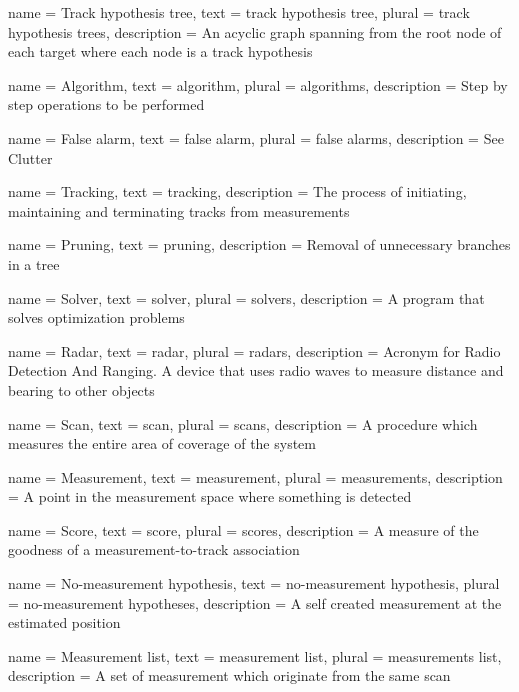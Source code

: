 {
	name 		= {Track hypothesis tree},
	text 		= {track hypothesis tree},
	plural 		= {track hypothesis trees},
	description = {An acyclic graph spanning from the root node of each target where each node is a track hypothesis}
}

{
	name 		= Algorithm,
	text 		= algorithm,
	plural 		= algorithms,
	description = {Step by step operations to be performed}
}

{
	name 		= {False alarm},
	text 		= {false alarm},
	plural 		= {false alarms},
	description = {See Clutter}
}

{
	name 		= Tracking,
	text 		= tracking,
	description = {The process of initiating, maintaining and terminating tracks from measurements}
}

{
	name 		= Pruning,
	text 		= pruning,
	description = {Removal of unnecessary branches in a tree}
}

{
	name 		= Solver,
	text 		= solver,
	plural 		= solvers,
	description = {A program that solves optimization problems}
}

{
	name 		= Radar,
	text 		= radar,
	plural 		= radars,
	description = {Acronym for Radio Detection And Ranging. A device that uses radio waves to measure distance and bearing to other objects}
}

{
	name 		= Scan,
	text		= scan,
	plural 		= scans,
	description = {A procedure which measures the entire area of coverage of the system}
}

{
	name 		= Measurement,
	text 		= measurement,
	plural 		= measurements,
	description = {A point in the measurement space where something is detected}
}

{
	name 		= Score,
	text 		= score,
	plural		= scores,
	description = {A measure of the goodness of a measurement-to-track association}
}

{
	name 		= {No-measurement hypothesis},
	text 		= {no-measurement hypothesis},
	plural		= {no-measurement hypotheses},
	description = {A self created measurement at the estimated position}
}

{
	name 		= {Measurement list},
	text 		= {measurement list},
	plural		= {measurements list},
	description = {A set of measurement which originate from the same scan}
}

